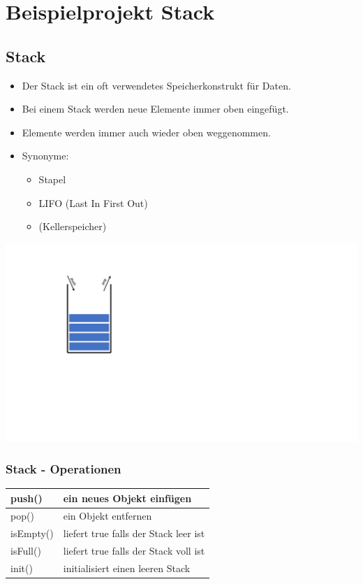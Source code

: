 \section{Beispielprojekt Stack}

\begin{multicols}{2}
	\subsection{Stack}
	\begin{minipage}{0.8\linewidth}
		\begin{itemize}
			\item Der Stack ist ein oft verwendetes Speicherkonstrukt für Daten.
			\item Bei einem Stack werden neue Elemente immer oben eingefügt.
			\item Elemente werden immer auch wieder oben weggenommen.
			\item Synonyme:
			\begin{itemize}
				\item Stapel
				\item LIFO (Last In First Out)
				\item (Kellerspeicher)
			\end{itemize}
		\end{itemize}
	\end{minipage}%
	\begin{minipage}{0.2\linewidth}
		\includegraphics[width=\linewidth]{images/klasse1.pdf}
	\end{minipage}
	\vfill\null
	\columnbreak
	\subsubsection{Stack - Operationen}
	\begin{tabular}{ll}
		\hline 
		push() & ein neues Objekt einfügen \\ 
		\hline 
		pop() & ein Objekt entfernen \\ 
		\hline 
		isEmpty() & liefert true falls der Stack leer ist \\ 
		\hline 
		isFull() & liefert true falls der Stack voll ist \\ 
		\hline 
		init() & initialisiert einen leeren Stack \\ 
		\hline 
	\end{tabular}
\end{multicols}


